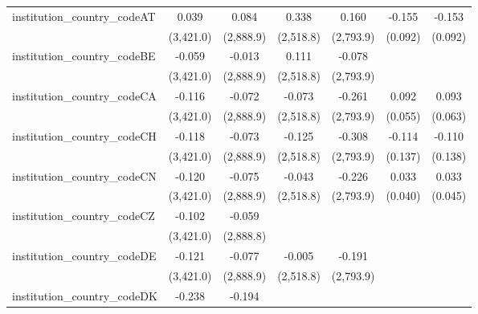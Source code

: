 \begin{tabular}{lcccccc}
   institution\_country\_codeAT          & 0.039          & 0.084          & 0.338         & 0.160         & -0.155         & -0.153\\   
                                         & (3,421.0)      & (2,888.9)      & (2,518.8)     & (2,793.9)     & (0.092)        & (0.092)\\   
   institution\_country\_codeBE          & -0.059         & -0.013         & 0.111         & -0.078        &                &   \\   
                                         & (3,421.0)      & (2,888.9)      & (2,518.8)     & (2,793.9)     &                &   \\   
   institution\_country\_codeCA          & -0.116         & -0.072         & -0.073        & -0.261        & 0.092          & 0.093\\   
                                         & (3,421.0)      & (2,888.9)      & (2,518.8)     & (2,793.9)     & (0.055)        & (0.063)\\   
   institution\_country\_codeCH          & -0.118         & -0.073         & -0.125        & -0.308        & -0.114         & -0.110\\   
                                         & (3,421.0)      & (2,888.9)      & (2,518.8)     & (2,793.9)     & (0.137)        & (0.138)\\   
   institution\_country\_codeCN          & -0.120         & -0.075         & -0.043        & -0.226        & 0.033          & 0.033\\   
                                         & (3,421.0)      & (2,888.9)      & (2,518.8)     & (2,793.9)     & (0.040)        & (0.045)\\   
   institution\_country\_codeCZ          & -0.102         & -0.059         &               &               &                &   \\   
                                         & (3,421.0)      & (2,888.8)      &               &               &                &   \\   
   institution\_country\_codeDE          & -0.121         & -0.077         & -0.005        & -0.191        &                &   \\   
                                         & (3,421.0)      & (2,888.9)      & (2,518.8)     & (2,793.9)     &                &   \\   
   institution\_country\_codeDK          & -0.238         & -0.194         &               &               &                &   \\   

\end{tabular}
